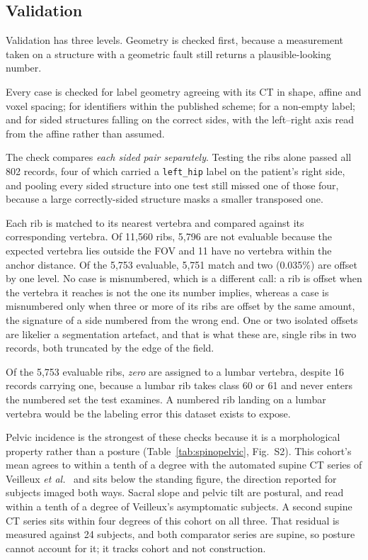 \documentclass[aapm,mph,amsmath,amssymb,reprint]{revtex4-2}
\begin{document}
\subsection{Validation}
\label{sec:validation}


Validation has three levels. Geometry is checked first, because a measurement taken on a
structure with a geometric fault still returns a plausible-looking number.

Every case is checked for label geometry agreeing with its CT in
shape, affine and voxel spacing; for identifiers within the published scheme; for a non-empty
label; and for sided structures falling on the correct sides, with the left--right axis read
from the affine rather than assumed. 

The check compares \emph{each sided pair separately}. Testing the ribs alone passed all 802
records, four of which carried a \texttt{left\_hip} label on the patient's right side, and
pooling every sided structure into one test still missed one of those four, because a large
correctly-sided structure masks a smaller transposed one.

Each rib is matched to its nearest vertebra and compared
against its corresponding vertebra. Of 11{,}560 ribs, 5{,}796 are not evaluable
because the expected vertebra lies outside the FOV and 11 have no vertebra within
the anchor distance. Of the 5{,}753 evaluable, 5{,}751 match and two (0.035\%) are offset by
one level. No case is misnumbered,
which is a different call: a rib is offset when the vertebra it reaches is not the one its
number implies, whereas a case is misnumbered only when three or more of its ribs are offset by
the same amount, the signature of a side numbered from the wrong end. One or two isolated
offsets are likelier a segmentation artefact, and that is what these are, single ribs in two
records, both truncated by the edge of the field.

Of the 5{,}753 evaluable ribs, \emph{zero} are assigned to a lumbar vertebra, despite 16 records
carrying one, because a lumbar rib takes class 60 or 61 and never enters the numbered set the
test examines. A numbered rib landing on a lumbar vertebra would be the labeling error this
dataset exists to expose.

Pelvic incidence is the strongest of these checks
because it is a morphological property rather than a posture (Table~\ref{tab:spinopelvic},
Fig.~S2). This cohort's mean agrees to
within a tenth of a degree with the automated supine CT series of Veilleux \emph{et
al.}~\cite{veilleux2020} and sits below the standing figure, the direction reported for subjects
imaged both ways.\cite{leeliu2022} Sacral slope and pelvic tilt are postural, and read within a tenth of a degree of Veilleux's asymptomatic subjects. A second supine CT series sits
within four degrees of this cohort on all three.\cite{hasegawa2018} That residual is measured against 24 subjects, and both comparator
series are supine, so posture cannot account for it; it tracks cohort and not construction.
\end{document}
